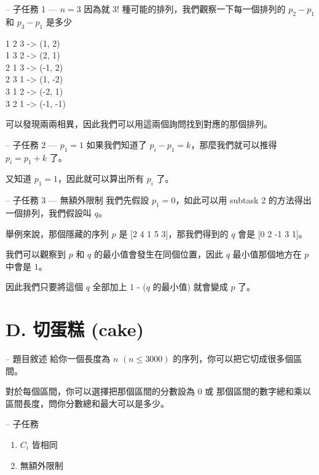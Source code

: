 \documentclass[hyperref,UTF8,notheorems,xcolor={dvipsnames}]{beamer}
\newcommand{\btitle}[1]{{\secname} -- #1}
\theoremstyle{definition}
\begin{document}
\begin{frame}[fragile]{\btitle{子任務 1 --- $n = 3$}}
	因為就 3! 種可能的排列，我們觀察一下每一個排列的 $p_2 - p_1$ 和 $p_3 - p_1$ 是多少 
	\pause

	1 2 3 -> (1, 2)  \\
	1 3 2 -> (2, 1)  \\
	2 1 3 -> (-1, 2)  \\
	2 3 1 -> (1, -2)  \\
	3 1 2 -> (-2, 1)  \\
	3 2 1 -> (-1, -1)
	\pause

	可以發現兩兩相異，因此我們可以用這兩個詢問找到對應的那個排列。
\end{frame}

\begin{frame}[fragile]{\btitle{子任務 2 --- $p_1 = 1$}}
	如果我們知道了 $p_i - p_1 = k$，那麼我們就可以推得 $p_i = p_1 + k$ 了。
	
	又知道 $p_1 = 1$，因此就可以算出所有 $p_i$ 了。
\end{frame}

\begin{frame}[fragile]{\btitle{子任務 3 --- 無額外限制}}
	我們先假設 $p_1 = 0$，如此可以用 subtask 2 的方法得出一個排列，我們假設叫 $q$。
	\pause

	舉例來說，那個隱藏的序列 $p$ 是 [2 4 1 5 3]，那我們得到的 $q$ 會是 [0 2 -1 3 1]。
	\pause

	我們可以觀察到 $p$ 和 $q$ 的最小值會發生在同個位置，因此 $q$ 最小值那個地方在 $p$ 中會是 $1$。
	
	因此我們只要將這個 $q$ 全部加上 $1$ - ($q$ 的最小值) 就會變成 $p$ 了。

\end{frame}



\section{D.  切蛋糕 (cake)}

\begin{frame}[fragile]{\btitle{題目敘述}}
	給你一個長度為 $n$ $(n \le 3000)$ 的序列，你可以把它切成很多個區間。
	
	對於每個區間，你可以選擇把那個區間的分數設為 $0$ 或 那個區間的數字總和乘以區間長度，問你分數總和最大可以是多少。
\end{frame}

\begin{frame}[fragile]{\btitle{子任務}}
	\begin{enumerate}
		\item $C_i$ 皆相同
		\item 無額外限制
	\end{enumerate}
\end{frame}
\end{document}

